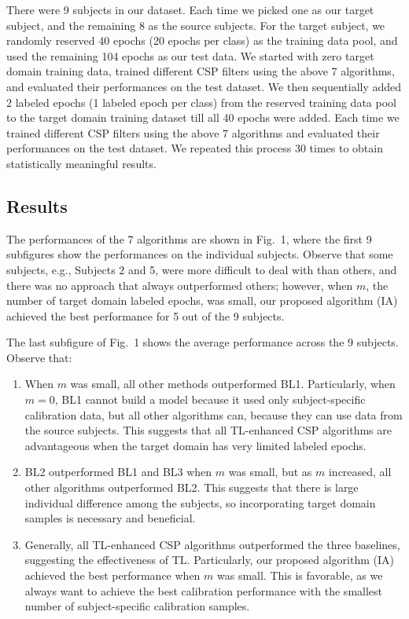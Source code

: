 \documentclass[runningheads]{llncs}
\begin{document}
There were 9 subjects in our dataset. Each time we picked one as our target subject, and the remaining 8 as the source subjects. For the target subject, we randomly reserved 40 epochs (20 epochs per class) as the training data pool, and used the remaining 104 epochs as our test data. We started with zero target domain training data, trained different CSP filters using the above 7 algorithms, and evaluated their performances on the test dataset. We then sequentially added 2 labeled epochs (1 labeled epoch per class) from the reserved training data pool to the target domain training dataset till all 40 epochs were added. Each time we trained different CSP filters using the above 7 algorithms and evaluated their performances on the test dataset. We repeated this process 30 times to obtain statistically meaningful results.

\subsection{Results}

The performances of the 7 algorithms are shown in Fig.~1, where the first 9 subfigures show the performances on the individual subjects. Observe that some subjects, e.g., Subjects 2 and 5, were more difficult to deal with than others, and there was no approach that always outperformed others; however, when $m$, the number of target domain labeled epochs, was small, our proposed algorithm (IA) achieved the best performance for 5 out of the 9 subjects.

The last subfigure of Fig.~1 shows the average performance across the 9 subjects. Observe that:
\begin{enumerate}
\item When $m$ was small, all other methods outperformed BL1. Particularly, when $m=0$, BL1 cannot build a model because it used only subject-specific calibration data, but all other algorithms can, because they can use data from the source subjects. This suggests that all TL-enhanced CSP algorithms are advantageous when the target domain has very limited labeled epochs.
\item BL2 outperformed BL1 and BL3 when $m$ was small, but as $m$ increased, all other algorithms outperformed BL2. This suggests that there is large individual difference among the subjects, so incorporating target domain samples is necessary and beneficial.
\item Generally, all TL-enhanced CSP algorithms outperformed the three baselines, suggesting the effectiveness of TL. Particularly, our proposed algorithm (IA) achieved the best performance when $m$ was small. This is favorable, as we always want to achieve the best calibration performance with the smallest number of subject-specific calibration samples.
\end{enumerate}
\end{document}
